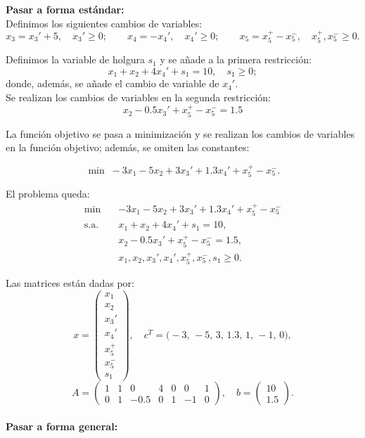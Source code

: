 \textbf{Pasar a forma estándar:}\\

Definimos los siguientes cambios de variables:
\[
x_3 = x_3' + 5,\quad x_3'\ge0;
\qquad
x_4 = -x_4',\quad x_4'\ge0;
\qquad
x_5 = x_5^+ - x_5^-,\quad x_5^+, x_5^-\ge0.
\]

Definimos la variable de holgura $s_1$ y se añade a la primera restricción:
\[
x_1 + x_2 +4x_4' + s_1 =10,\quad s_1\ge0;
\]
donde, además, se añade el cambio de variable de $x_4'$.\\

Se realizan los cambios de variables en la segunda restricción:
\[
x_2 -0.5x_3' + x_5^+ - x_5^- =1.5
\]

La función objetivo se pasa a minimización y se realizan los cambios de variables en la función objetivo; además, se omiten las constantes:

\[
\min\;-3x_1 -5x_2 +3x_3' +1.3x_4' +x_5^+ - x_5^-.
\]

El problema queda:
\[
\begin{aligned}
\min\quad & -3x_1 -5x_2 +3x_3' +1.3x_4' +x_5^+ - x_5^- \\
\text{s.a.}\quad
& x_1 + x_2 +4x_4' + s_1 =10,\\
& x_2 -0.5x_3' + x_5^+ - x_5^- =1.5,\\
& x_1, x_2, x_3', x_4', x_5^+, x_5^-, s_1 \ge0.
\end{aligned}
\]

Las matrices están dadas por:
\[
x = \begin{pmatrix}
x_1\\ x_2\\ x_3'\\ x_4'\\ x_5^+\\ x_5^-\\ s_1
\end{pmatrix},
\quad
c^T = \bigl(-3,\,-5,\,3,\,1.3,\,1,\,-1,\,0\bigr),
\]
\[
A =
\begin{pmatrix}
1 & 1   & 0    & 4 & 0 & 0 & 1\\
0 & 1   & -0.5 & 0 & 1 & -1 & 0
\end{pmatrix},
\quad
b = \begin{pmatrix}10\\1.5\end{pmatrix}.
\]\\

\textbf{Pasar a forma general:}\\

